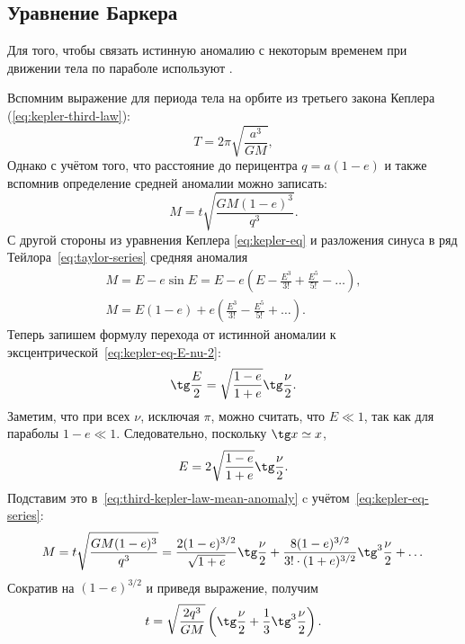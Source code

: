 \subsection{Уравнение Баркера}
Для того, чтобы связать истинную аномалию с некоторым временем при движении тела по параболе используют .

Вспомним выражение для периода тела на орбите из третьего закона Кеплера (\ref{eq:kepler-third-law}):
\begin{equation*}
	T = 2\pi \sqrt{\frac{a^3}{GM}},
\end{equation*}
Однако с учётом того, что расстояние до перицентра  $q = a(1-e)$ и также вспомнив определение средней аномалии можно записать:
\begin{equation}
	M = t \sqrt{\frac{GM(1 - e)^3}{q^3}}.
	\label{eq:third-kepler-law-mean-anomaly}
\end{equation}
С другой стороны из уравнения Кеплера \eqref{eq:kepler-eq} и разложения синуса в ряд Тейлора~\eqref{eq:taylor-series} средняя аномалия
\begin{gather}
	M = E - e \sin E = E - e \left(E - \frac{E^3}{3!} + \frac{E^5}{5!} - \dots\right),\nonumber\\
	M = E(1-e) + e\left(\frac{E^3}{3!} - \frac{E^5}{5!} + \dots \right).
	\label{eq:kepler-eq-series}
\end{gather}
Теперь запишем формулу перехода от истинной аномалии к эксцентрической~\eqref{eq:kepler-eq-E-nu-2}:
\begin{equation*}
	\tg \frac{E}{2} = \sqrt{\frac{1-e}{1+e}} \tg \frac{\nu}{2}.
\end{equation*}
Заметим, что при всех $\nu$, исключая $\pi$, можно считать, что $E \ll 1$, так как для параболы $1-e \ll 1$. Следовательно, поскольку $\tg x \simeq x$,
\begin{equation*}
	E = 2 \sqrt{\frac{1-e}{1+e}} \tg \frac{\nu}{2}.
\end{equation*}
Подставим это в~\eqref{eq:third-kepler-law-mean-anomaly} c учётом~\eqref{eq:kepler-eq-series}:
\begin{equation*}
	M = t \sqrt{\frac{GM(1-e)^3}{q^3}} = \frac{2(1-e)^{3/2}}{\sqrt{1+e}}\tg\frac{\nu}{2} + \frac{8(1-e)^{3/2}}{3! \cdot (1+e)^{3/2}}\tg^3 \frac{\nu}{2} + \dots
\end{equation*}
Сократив на $(1-e)^{3/2}$ и приведя выражение, получим 
\begin{equation}
	t = \sqrt{\frac{2q^3}{GM}}\left(\tg \frac{\nu}{2 } + \frac{1}{3}\tg^3 \frac{\nu}{2}\right).
\end{equation}
